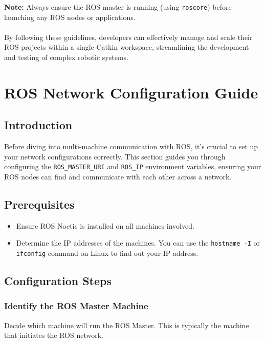 \documentclass[12pt,a4paper]{article}
\begin{document}
	\textbf{Note:} Always ensure the ROS master is running (using \texttt{roscore}) before launching any ROS nodes or applications.
	\\\\
	By following these guidelines, developers can effectively manage and scale their ROS projects within a single Catkin workspace, streamlining the development and testing of complex robotic systems.
	
	\section{ROS Network Configuration Guide}
	\subsection{Introduction}
	Before diving into multi-machine communication with ROS, it's crucial to set up your network configurations correctly. This section guides you through configuring the \texttt{ROS\_MASTER\_URI} and \texttt{ROS\_IP} environment variables, ensuring your ROS nodes can find and communicate with each other across a network.
	
	\subsection{Prerequisites}
	\begin{itemize}
		\item Ensure ROS Noetic is installed on all machines involved.
		\item Determine the IP addresses of the machines. You can use the \texttt{hostname -I} or \texttt{ifconfig} command on Linux to find out your IP address.
	\end{itemize}
	
	\subsection{Configuration Steps}
	\subsubsection{Identify the ROS Master Machine}
	Decide which machine will run the ROS Master. This is typically the machine that initiates the ROS network.
	
\end{document}
